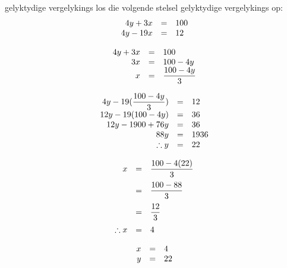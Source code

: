 \begin{wex}
{gelyktydige vergelykings}
{
los die volgende stelsel gelyktydige vergelykings op:
\begin{equation*}
\begin{array}{ccc}\hfill 4y+3x& =& 100\hfill \\ 
\hfill 4y - 19x& =& 12\hfill 
\end{array}
\end{equation*}
}
{
\begin{equation*}
    \begin{array}{ccl}\hfill 4y+3x & =& 100\hfill \\
\hfill 3x &=& 100 - 4y \hfill \\
\hfill x& =& \dfrac{100 - 4y}{3} \hfill
    \end{array}
\end{equation*}


\begin{equation*}
    \begin{array}{ccl}\hfill 4y - 19(\dfrac{100 - 4y}{3})& =& 12\hfill \\
	\hfill 12y - 19(100 - 4y)  & =& 36\hfill \\
	\hfill 12y - 1900 + 76y & =& 36 \hfill \\
\hfill  88y& =& 1936 \hfill \\
\hfill \therefore y& =& 22 \hfill
    \end{array}
\end{equation*}

\begin{equation*}
    \begin{array}{ccl}\hfill x &=& \dfrac{100 - 4(22)}{3}\hfill \vspace{6pt}\\
	\hfill & =& \dfrac{100-88}{3}\hfill \vspace{6pt}\\
	\hfill & =& \dfrac{12}{3}\hfill\vspace{6pt} \\
	\hfill \therefore x&=& 4 \hfill 
    \end{array}
\end{equation*}


\begin{equation*}
\begin{array}{ccc}
 \hfill x& =& 4\hfill \\
\hfill y& =& 22\hfill 
\end{array}
\end{equation*}
}
\end{wex}

